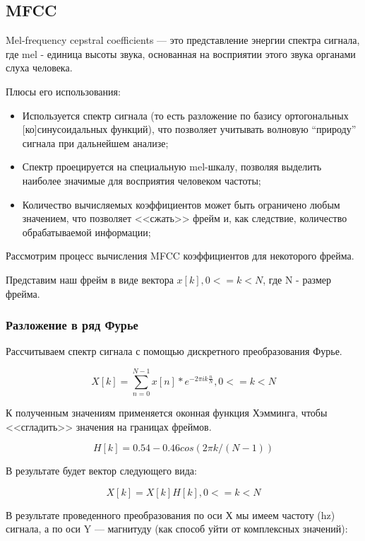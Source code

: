 \documentclass[a4paper,14pt]{extarticle}
\begin{document}
 	\subsection{MFCC}
 	
 	Mel-frequency cepstral coefficients — это представление энергии спектра сигнала, где mel - единица высоты звука, основанная на восприятии этого звука органами слуха человека.
 	
 	Плюсы его использования:
 	
 	\begin{itemize}
 		\item Используется спектр сигнала (то есть разложение по базису ортогональных [ко]синусоидальных функций), что позволяет учитывать волновую “природу” сигнала при дальнейшем анализе;
 		
 		\item Спектр проецируется на специальную mel-шкалу, позволяя выделить наиболее значимые для восприятия человеком частоты;
 		
 		\item Количество вычисляемых коэффициентов может быть ограничено любым значением, что позволяет <<сжать>> фрейм и, как следствие, количество обрабатываемой информации;
 	\end{itemize}
 
 	Рассмотрим процесс вычисления MFCC коэффициентов для некоторого фрейма.
 	
 	Представим наш фрейм в виде вектора $x[k], 0 <=k<N$, где N - размер фрейма.
 	
 	\subsubsection{Разложение в ряд Фурье}
 	
 	Рассчитываем спектр сигнала с помощью дискретного преобразования Фурье.
 	
 	\[X[k] = \sum_{n=0}^{N - 1} x[n] * e^{-2 \pi i k \frac{n}{N}}, 0 <= k < N\]
 	
 	К полученным значениям применяется оконная функция Хэмминга, чтобы <<сгладить>> значения на границах фреймов.
 	
 	\[H[k] = 0.54 - 0.46 cos(2 \pi k/(N - 1))\]
 	
 	В результате будет вектор следующего вида:
 	
 	\[X[k] = X[k] H[k], 0 <= k < N\]
 	
 	В результате проведенного преобразования по оси Х мы имеем частоту (hz) сигнала, а по оси Y — магнитуду (как способ уйти от комплексных значений):
 	
\end{document}
